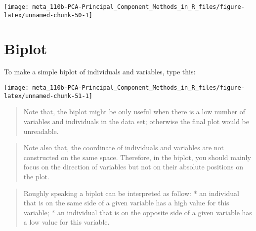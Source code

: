\documentclass[]{book}
\newenvironment{Shaded}{\begin{snugshade}}{\end{snugshade}}
\newcommand{\CommentTok}[1]{\textcolor[rgb]{0.56,0.35,0.01}{\textit{#1}}}
\newcommand{\DataTypeTok}[1]{\textcolor[rgb]{0.13,0.29,0.53}{#1}}
\newcommand{\KeywordTok}[1]{\textcolor[rgb]{0.13,0.29,0.53}{\textbf{#1}}}
\newcommand{\NormalTok}[1]{#1}
\newcommand{\OperatorTok}[1]{\textcolor[rgb]{0.81,0.36,0.00}{\textbf{#1}}}
\newcommand{\OtherTok}[1]{\textcolor[rgb]{0.56,0.35,0.01}{#1}}
\newcommand{\StringTok}[1]{\textcolor[rgb]{0.31,0.60,0.02}{#1}}
\begin{document}
\begin{center}\texttt{[image: meta\_110b-PCA-Principal\_Component\_Methods\_in\_R\_files/figure-latex/unnamed-chunk-50-1]} \end{center}

\hypertarget{biplot}{%
\section{Biplot}\label{biplot}}

To make a simple biplot of individuals and variables, type this:

\begin{Shaded}
\end{Shaded}

\begin{center}\texttt{[image: meta\_110b-PCA-Principal\_Component\_Methods\_in\_R\_files/figure-latex/unnamed-chunk-51-1]} \end{center}

\begin{quote}
Note that, the biplot might be only useful when there is a low number of variables and individuals in the data set; otherwise the final plot would be unreadable.
\end{quote}

\begin{quote}
Note also that, the coordinate of individuals and variables are not constructed on the same space. Therefore, in the biplot, you should mainly focus on the direction of variables but not on their absolute positions on the plot.
\end{quote}

\begin{quote}
Roughly speaking a biplot can be interpreted as follow:
* an individual that is on the same side of a given variable has a high value for this variable;
* an individual that is on the opposite side of a given variable has a low value for this variable.
\end{quote}

\begin{Shaded}
\end{Shaded}
\end{document}
